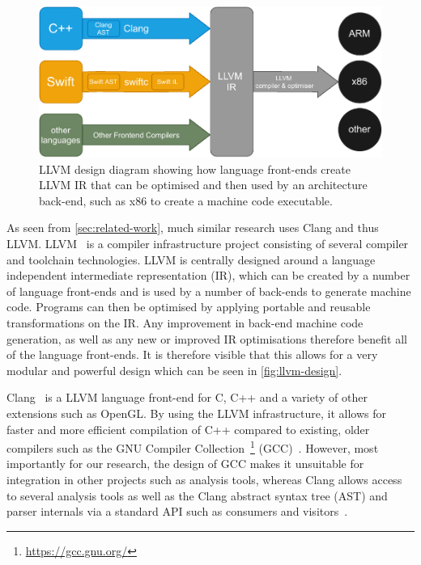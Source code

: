 \documentclass{mpaper}
\begin{document}
    \begin{figure}
        \centering
        \includegraphics[scale=0.75]{images/llvm.pdf}
        \caption{LLVM design diagram showing how language front-ends create LLVM IR that can be optimised and then used by an architecture back-end, such as x86 to create a machine code executable.}
        \label{fig:llvm-design}
    \end{figure}  
    
    As seen from \autoref{sec:related-work}, much similar research uses Clang and thus LLVM.
    LLVM~\cite{Lattner2004} is a compiler infrastructure project consisting of several compiler and toolchain technologies. 
    LLVM is centrally designed around a language independent intermediate representation (IR), which can be created by a number of language front-ends and is used by a number of back-ends to generate machine code. 
    Programs can then be optimised by applying portable and reusable transformations on the IR.
    Any improvement in back-end machine code generation, as well as any new or improved IR optimisations therefore benefit all of the language front-ends.
    It is therefore visible that this allows for a very modular and powerful design which can be seen in \autoref{fig:llvm-design}.
    
    Clang~\cite{Lattner2008} is a LLVM language front-end for C, C++ and a variety of other extensions such as OpenGL.
    By using the LLVM infrastructure, it allows for faster and more efficient compilation of C++ compared to existing, older compilers such as the GNU Compiler Collection~\footnote{\url{https://gcc.gnu.org/}} (GCC)~\cite{Lattner2008}.
    However, most importantly for our research, the design of GCC makes it unsuitable for integration in other projects such as analysis tools, whereas Clang allows access to several analysis tools as well as the Clang abstract syntax tree (AST) and parser internals via a standard API such as consumers and visitors~\cite{Duffy2014}.
    
\end{document}
